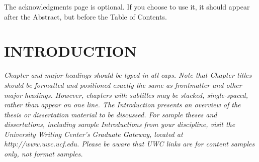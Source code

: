 \documentclass{UCF_ETD}
\begin{document}
\begin{acknowledgments}
The acknowledgments page is optional. If you choose to use it, it should appear after the Abstract, but before the Table of Contents.
\end{acknowledgments}

\tableofcontents

\listoffigures

\listoftables

\mainmatter

\chapter{INTRODUCTION} 
\textit{Chapter and major headings should be typed in all caps.  Note that Chapter titles should be formatted and positioned exactly the same as frontmatter and other major headings. However, chapters with subtitles may be stacked, single-spaced, rather than appear on one line.
The Introduction presents an overview of the thesis or dissertation material to be discussed. For sample theses and dissertations, including sample Introductions from your discipline, visit the University Writing Center’s Graduate Gateway, located at http://www.uwc.ucf.edu. Please be aware that UWC links are for content samples only, not format samples.
}

\begin{comment}
Notes and Guidance for Introduction
1. Background - Introduce readers to current state of DL/AI in communications. Talk about Evolution and Significance of real world datasets like deepsnse or others...
2. Problem Statement - Define the problem clearly -- Beam Prediction
3. Objective - Give the main objective of the thesis such as Beam Prediction and domain adaptation, using multimodal.

Multimodal Networks 
1. Theory and Significance - Discuss the role and importance of MM Networks in DL, with respect to Communications.
2. Application to Deepsense 6G -- How do MM Networks apply to dataset? Discuss how to integrate multiple types of data can enhance learning process
3. Technical Challenges of MM -- Data Fusion, synchronization, etc

Data and Communication Challenges
1. Characteristics of DeepSense Dataset - Describe data in detail -- composition, time-based measurements, etc.
2. Data Processing and Management - Challenges i`n Handling real-world data...noise filter, data cleanring, and data integrity
3. Communication Specific Challenges -- Beamforming prediction, signal interference, etc.
\end{comment}
\end{document}

